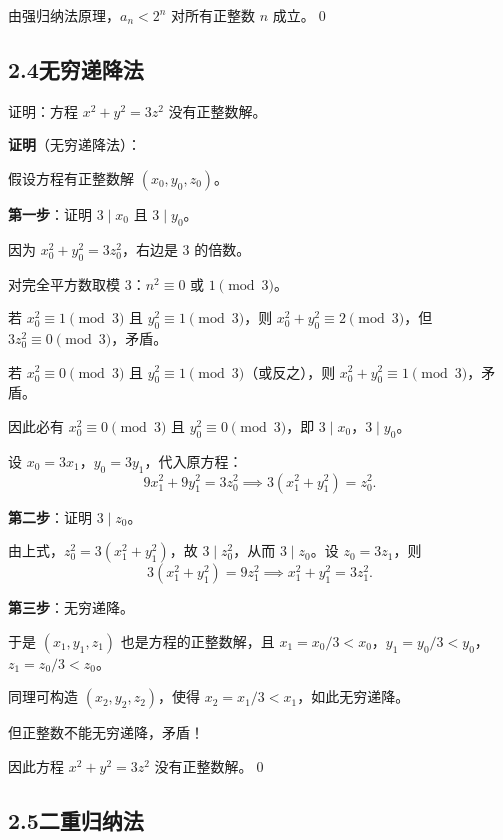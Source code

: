\documentclass[12pt, a4paper]{ctexart}
\begin{document}
由强归纳法原理，$a_n < 2^n$ 对所有正整数 $n$ 成立。\qed

\subsection*{2.4\quad 无穷递降法}

\begin{examplebox}[【例题8】用无穷递降法证明]
证明：方程 $x^2 + y^2 = 3z^2$ 没有正整数解。
\end{examplebox}

\textbf{证明}（无穷递降法）：

假设方程有正整数解 $(x_0, y_0, z_0)$。

\textbf{第一步}：证明 $3 \mid x_0$ 且 $3 \mid y_0$。

因为 $x_0^2 + y_0^2 = 3z_0^2$，右边是 $3$ 的倍数。

对完全平方数取模 $3$：$n^2 \equiv 0$ 或 $1 \pmod{3}$。

若 $x_0^2 \equiv 1 \pmod{3}$ 且 $y_0^2 \equiv 1 \pmod{3}$，则 $x_0^2 + y_0^2 \equiv 2 \pmod{3}$，但 $3z_0^2 \equiv 0 \pmod{3}$，矛盾。

若 $x_0^2 \equiv 0 \pmod{3}$ 且 $y_0^2 \equiv 1 \pmod{3}$（或反之），则 $x_0^2 + y_0^2 \equiv 1 \pmod{3}$，矛盾。

因此必有 $x_0^2 \equiv 0 \pmod{3}$ 且 $y_0^2 \equiv 0 \pmod{3}$，即 $3 \mid x_0$，$3 \mid y_0$。

设 $x_0 = 3x_1$，$y_0 = 3y_1$，代入原方程：
\[ 9x_1^2 + 9y_1^2 = 3z_0^2 \implies 3(x_1^2 + y_1^2) = z_0^2. \]

\textbf{第二步}：证明 $3 \mid z_0$。

由上式，$z_0^2 = 3(x_1^2 + y_1^2)$，故 $3 \mid z_0^2$，从而 $3 \mid z_0$。设 $z_0 = 3z_1$，则
\[ 3(x_1^2 + y_1^2) = 9z_1^2 \implies x_1^2 + y_1^2 = 3z_1^2. \]

\textbf{第三步}：无穷递降。

于是 $(x_1, y_1, z_1)$ 也是方程的正整数解，且 $x_1 = x_0/3 < x_0$，$y_1 = y_0/3 < y_0$，$z_1 = z_0/3 < z_0$。

同理可构造 $(x_2, y_2, z_2)$，使得 $x_2 = x_1/3 < x_1$，如此无穷递降。

但正整数不能无穷递降，矛盾！

因此方程 $x^2 + y^2 = 3z^2$ 没有正整数解。\qed

\subsection*{2.5\quad 二重归纳法}
\end{document}
